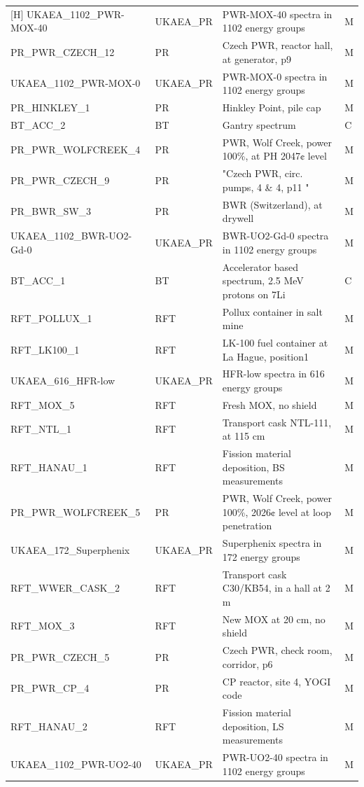 \documentclass[a4paper, 12pt]{article}
\begin{document}
\begin{appendices}
\begin{longtable}{llll}[H]
UKAEA\_1102\_PWR-MOX-40 & UKAEA\_PR & PWR-MOX-40 spectra in 1102 energy groups & M\\
PR\_PWR\_CZECH\_12 & PR & Czech PWR, reactor hall, at generator, p9  & M\\
UKAEA\_1102\_PWR-MOX-0 & UKAEA\_PR & PWR-MOX-0 spectra in 1102 energy groups & M\\
PR\_HINKLEY\_1 & PR & Hinkley Point, pile cap  & M\\
BT\_ACC\_2 & BT & Gantry spectrum  & C\\
PR\_PWR\_WOLFCREEK\_4 & PR & PWR, Wolf Creek, power 100\%, at PH 2047¢ level  & M\\
PR\_PWR\_CZECH\_9 & PR & "Czech PWR, circ. pumps, 4 \& 4, p11 " & M\\
PR\_BWR\_SW\_3 & PR & BWR (Switzerland), at drywell  & M\\
UKAEA\_1102\_BWR-UO2-Gd-0 & UKAEA\_PR & BWR-UO2-Gd-0 spectra in 1102 energy groups & M\\
BT\_ACC\_1 & BT & Accelerator based spectrum, 2.5 MeV protons on 7Li  & C\\
RFT\_POLLUX\_1 & RFT & Pollux container in salt mine  & M\\
RFT\_LK100\_1 & RFT & LK-100 fuel container at La Hague, position1  & M\\
UKAEA\_616\_HFR-low & UKAEA\_PR & HFR-low spectra in 616 energy groups & M\\
RFT\_MOX\_5 & RFT & Fresh MOX, no shield  & M\\
RFT\_NTL\_1 & RFT & Transport cask NTL-111, at 115 cm  & M\\
RFT\_HANAU\_1 & RFT & Fission material deposition, BS measurements  & M\\
PR\_PWR\_WOLFCREEK\_5 & PR & PWR, Wolf Creek, power 100\%, 2026¢ level at loop penetration  & M\\
UKAEA\_172\_Superphenix & UKAEA\_PR & Superphenix spectra in 172 energy groups & M\\
RFT\_WWER\_CASK\_2 & RFT & Transport cask C30/KB54, in a hall at 2 m  & M\\
RFT\_MOX\_3 & RFT & New MOX at 20 cm, no shield  & M\\
PR\_PWR\_CZECH\_5 & PR & Czech PWR, check room, corridor, p6  & M\\
PR\_PWR\_CP\_4 & PR & CP reactor, site 4, YOGI code  & M\\
RFT\_HANAU\_2 & RFT & Fission material deposition, LS measurements  & M\\
UKAEA\_1102\_PWR-UO2-40 & UKAEA\_PR & PWR-UO2-40 spectra in 1102 energy groups & M\\

\end{longtable}
\end{appendices}
\end{document}
